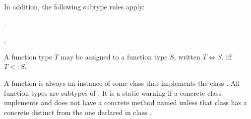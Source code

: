 \documentclass{article}
\begin{document}
\LMHash{}
In addition, the following subtype rules apply:



.

\vspace{2mm}

.

\vspace{2mm}

%
%
%


\LMHash{}
A function type $T$ may be assigned to a function type $S$, written $T \Longleftrightarrow S$, if{}f $T <: S$.

\LMHash{}
A function is always an instance of some class that implements the class \FUNCTION{}.
All function types are subtypes of \FUNCTION{}.
It is a static warning if a concrete class implements \FUNCTION{} and does not have a concrete method named \CALL{} unless that class has a concrete  distinct from the one declared in class .
\end{document}
